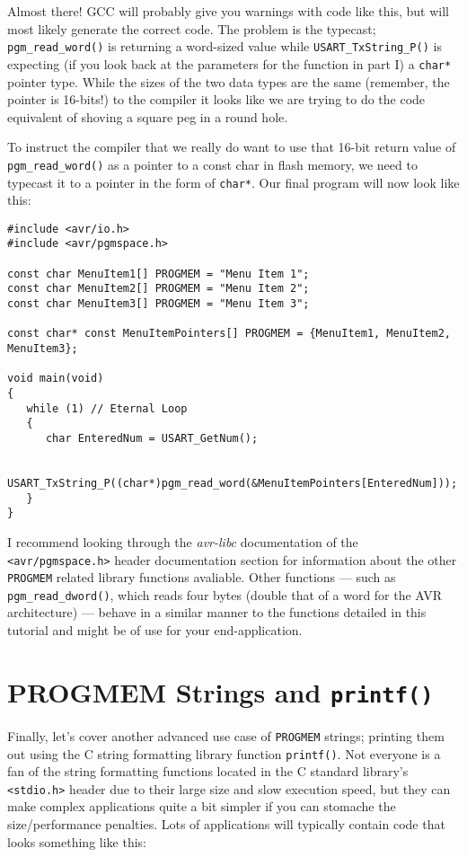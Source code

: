 \documentclass[a4paper,oneside,notitlepage]{book}
\begin{document}
Almost there! GCC will probably give you warnings with code like this, but will most likely generate the correct code. The problem is the typecast; \lstinline{pgm_read_word()} is returning a word-sized value while \lstinline{USART_TxString_P()} is expecting (if you look back at the parameters for the function in part I) a \lstinline{char*} pointer type. While the sizes of the two data types are the same (remember, the pointer is 16-bits!) to the compiler it looks like we are trying to do the code equivalent of shoving a square peg in a round hole.

To instruct the compiler that we really do want to use that 16-bit return value of \lstinline{pgm_read_word()} as a pointer to a const char in flash memory, we need to typecast it to a pointer in the form of \lstinline{char*}. Our final program will now look like this:

\begin{center}
\begin{lstlisting}
#include <avr/io.h>
#include <avr/pgmspace.h>

const char MenuItem1[] PROGMEM = "Menu Item 1";
const char MenuItem2[] PROGMEM = "Menu Item 2";
const char MenuItem3[] PROGMEM = "Menu Item 3";

const char* const MenuItemPointers[] PROGMEM = {MenuItem1, MenuItem2, MenuItem3};

void main(void)
{
   while (1) // Eternal Loop
   {
      char EnteredNum = USART_GetNum();

      USART_TxString_P((char*)pgm_read_word(&MenuItemPointers[EnteredNum]));
   }
}
\end{lstlisting}
\end{center}

I recommend looking through the \textit{avr-libc} documentation of the \lstinline{<avr/pgmspace.h>} header documentation section for information about the other \lstinline{PROGMEM} related library functions avaliable. Other functions --- such as \lstinline{pgm_read_dword()}, which reads four bytes (double that of a word for the AVR architecture) --- behave in a similar manner to the functions detailed in this tutorial and might be of use for your end-application.


\section{PROGMEM Strings and \texttt{printf()}}

Finally, let's cover another advanced use case of \lstinline{PROGMEM} strings; printing them out using the C string formatting library function \lstinline{printf()}. Not everyone is a fan of the string formatting functions located in the C standard library's \lstinline{<stdio.h>} header due to their large size and slow execution speed, but they can make complex applications quite a bit simpler if you can stomache the size/performance penalties. Lots of applications will typically contain code that looks something like this:
\end{document}
